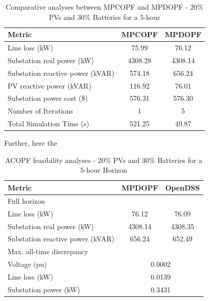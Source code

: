 \documentclass[../../outputs/main.tex]{subfiles}
\begin{document}
\begin{table}[h!]
    \centering
    \caption{Comparative analyses between MPCOPF and MPDOPF - $20 \%$ PVs and $30 \%$ Batteries for a $5$-hour}
    \begin{tabular}{|l|c|c|}
    \hline
    \textbf{Metric} & \textbf{MPCOPF} & \textbf{MPDOPF} \\ \hline
    Line loss (kW) & 75.99 & 76.12 \\ \hline
    Substation real power (kW) & 4308.28 & 4308.14 \\ \hline
    Substation reactive power (kVAR) & 574.18 & 656.24 \\ \hline
    PV reactive power (kVAR) & 116.92 & 76.01 \\ \hline
    Substation power cost (\$) & 576.31 & 576.30 \\ \hline
    Number of Iterations & 1 & 5 \\ \hline
    Total Simulation Time (s) & 521.25 & 49.87 \\ \hline
    \end{tabular}
    \label{table:opt-5-20-30}
\end{table}


Further, here the 

\begin{table}[h!]
    \centering
    \caption{ACOPF feasibility analyses - $20 \%$ PVs and $30 \%$ Batteries for a $5$-hour Horizon}
    \begin{tabular}{|l|c|c|}
    \hline
    \textbf{Metric} & \textbf{MPDOPF} & \textbf{OpenDSS} \\ \hline
    Full horizon  & \multicolumn{2}{c|}{} \\ \hline
    \quad Line loss (kW) & 76.12 & 76.09 \\ \hline
    \quad Substation real power (kW) & 4308.14 & 4308.35 \\ \hline
    \quad Substation reactive power (kVAR) & 656.24 & 652.49 \\ \hline
    Max. all-time discrepancy & \multicolumn{2}{c|}{} \\ \hline
    \quad Voltage (pu) & \multicolumn{2}{c|}{0.0002} \\ \hline
    \quad Line loss (kW) & \multicolumn{2}{c|}{0.0139} \\ \hline
    \quad Substation power (kW) & \multicolumn{2}{c|}{0.3431} \\ \hline
    \end{tabular}
    \label{table:feas-5-20-30}
\end{table}
\end{document}

